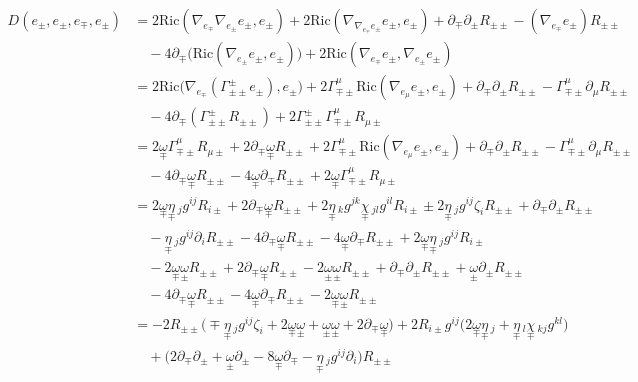 \documentclass[a4paper,11pt]{article}
\newcommand{\R}{{\mathrm{Ric}}}
\begin{document}
\begin{align*}
    D(e_\pm,e_\pm, e_\mp, e_\pm) 
    &=2\R(\nabla_{e_\mp}\nabla_{{e_\pm}} e_\pm ,e_\pm )
    + 2\R(\nabla_{\nabla_{e_\mp}{e_\pm}} e_\pm ,e_\pm )
    + \partial_\mp \partial_\pm R_{\pm\pm}
    -(\nabla_{e_\mp} {e_\pm})R_{\pm\pm}\\
    &\quad 
    -4 \partial_\mp\big(\R(\nabla_{{e_\pm}} e_\pm , e_\pm )\big)
    + 2 \R(\nabla_{e_\mp} e_\pm , \nabla_{{e_\pm}} e_\pm ) \\
    &=2\R\big(\nabla_{e_\mp}(\Gamma_{\pm\pm}^\pm e_\pm) ,e_\pm \big)
    + 2\Gamma_{\mp\pm}^\mu \R(\nabla_{e_\mu} e_\pm ,e_\pm )
    + \partial_\mp \partial_\pm R_{\pm\pm}
    -\Gamma_{\mp\pm}^\mu \partial_\mu R_{\pm\pm}\\
    &\quad 
    -4 \partial_\mp(\Gamma_{\pm\pm}^\pm R_{\pm\pm})
    + 2 \Gamma_{\pm\pm}^\pm \Gamma_{\mp\pm}^\mu R_{\mu\pm}\\
    &=2\underset{\mp}{\omega} \Gamma_{\mp\pm}^\mu R_{\mu\pm}
    + 2 \partial_\mp \underset{\mp}{\omega} R_{\pm\pm}
    + 2\Gamma_{\mp\pm}^\mu \R(\nabla_{e_\mu} e_\pm ,e_\pm )
    + \partial_\mp \partial_\pm R_{\pm\pm}
    -\Gamma_{\mp\pm}^\mu \partial_\mu R_{\pm\pm}\\
    &\quad 
    -4 \partial_\mp\underset{\mp}{\omega} R_{\pm\pm}
    -4 \underset{\mp}{\omega} \partial_\mp R_{\pm\pm}
    + 2 \underset{\mp}{\omega} \Gamma_{\mp\pm}^\mu R_{\mu\pm}\\
    &=2\underset{\mp}{\omega} \underset{\mp}{\eta}\,_j g^{ij} R_{i \pm}
    + 2 \partial_\mp \underset{\mp}{\omega} R_{\pm\pm}
    + 2\underset{\mp}{\eta}\,_k g^{jk} \underset{\mp}{\chi}\,_{jl}g^{il} R_{i\pm}
    \pm 2\underset{\mp}{\eta}\,_j g^{ij} \zeta_i R_{\pm\pm}
    + \partial_\mp \partial_\pm R_{\pm\pm}\\
    &\quad 
    -\underset{\mp}{\eta}\,_j g^{ij} \partial_i  R_{\pm\pm}
    -4 \partial_\mp\underset{\mp}{\omega} R_{\pm\pm}
    -4 \underset{\mp}{\omega} \partial_\mp R_{\pm\pm}
    + 2 \underset{\mp}{\omega} \underset{\mp}{\eta}\,_j g^{ij} R_{i \pm}\\
    &\quad - 2\underset{\mp}{\omega} \underset{\pm}{\omega} R_{\pm\pm}
    + 2 \partial_\mp \underset{\mp}{\omega} R_{\pm\pm}
    - 2\underset{\pm}{\omega} \underset{\pm}{\omega} R_{\pm\pm}
    + \partial_\mp \partial_\pm R_{\pm\pm}
    +\underset{\pm}{\omega} \partial_\pm R_{\pm\pm}\\
    &\quad 
    -4 \partial_\mp\underset{\mp}{\omega} R_{\pm\pm}
    -4 \underset{\mp}{\omega} \partial_\mp R_{\pm\pm}
    - 2 \underset{\mp}{\omega} \underset{\pm}{\omega} R_{\pm\pm}\\
    &= - 2 R_{\pm\pm} \Big(
    \mp \underset{\mp}{\eta}\,_j g^{ij} \zeta_i
    + 2 \underset{\mp}{\omega} \underset{\pm}{\omega}
    + \underset{\pm}{\omega} \underset{\pm}{\omega}
    +2 \partial_\mp\underset{\mp}{\omega} \Big)
    + 2 R_{i\pm} g^{ij} \Big(2 \underset{\mp}{\omega} \underset{\mp}{\eta}\,_j 
    + \underset{\mp}{\eta}\,_l \underset{\mp}{\chi}\,_{kj} g^{kl} \Big)\\
    &\quad
    + \Big(2 \partial_\mp \partial_\pm
    +\underset{\pm}{\omega} \partial_\pm
    -8 \underset{\mp}{\omega} \partial_\mp
    -\underset{\mp}{\eta}\,_j g^{ij} \partial_i  \Big) R_{\pm\pm}
\end{align*}
\end{document}
